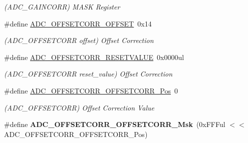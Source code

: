 \begin{DoxyCompactItemize}
\begin{DoxyCompactList}\small\item\em (A\+D\+C\+\_\+\+G\+A\+I\+N\+C\+O\+R\+R) M\+A\+S\+K Register \end{DoxyCompactList}\item 
\hypertarget{group___s_a_m_l21___a_d_c_gae30e343440c647c0051e1b85bbb1b4d7}{}\#define \hyperlink{group___s_a_m_l21___a_d_c_gae30e343440c647c0051e1b85bbb1b4d7}{A\+D\+C\+\_\+\+O\+F\+F\+S\+E\+T\+C\+O\+R\+R\+\_\+\+O\+F\+F\+S\+E\+T}~0x14\label{group___s_a_m_l21___a_d_c_gae30e343440c647c0051e1b85bbb1b4d7}

\begin{DoxyCompactList}\small\item\em (A\+D\+C\+\_\+\+O\+F\+F\+S\+E\+T\+C\+O\+R\+R offset) Offset Correction \end{DoxyCompactList}\item 
\hypertarget{group___s_a_m_l21___a_d_c_ga235cb38d1ff56b8a68b4fc572ff8927f}{}\#define \hyperlink{group___s_a_m_l21___a_d_c_ga235cb38d1ff56b8a68b4fc572ff8927f}{A\+D\+C\+\_\+\+O\+F\+F\+S\+E\+T\+C\+O\+R\+R\+\_\+\+R\+E\+S\+E\+T\+V\+A\+L\+U\+E}~0x0000ul\label{group___s_a_m_l21___a_d_c_ga235cb38d1ff56b8a68b4fc572ff8927f}

\begin{DoxyCompactList}\small\item\em (A\+D\+C\+\_\+\+O\+F\+F\+S\+E\+T\+C\+O\+R\+R reset\+\_\+value) Offset Correction \end{DoxyCompactList}\item 
\hypertarget{group___s_a_m_l21___a_d_c_ga9b51f7b2fce4e38ea6e2f545e8200cb0}{}\#define \hyperlink{group___s_a_m_l21___a_d_c_ga9b51f7b2fce4e38ea6e2f545e8200cb0}{A\+D\+C\+\_\+\+O\+F\+F\+S\+E\+T\+C\+O\+R\+R\+\_\+\+O\+F\+F\+S\+E\+T\+C\+O\+R\+R\+\_\+\+Pos}~0\label{group___s_a_m_l21___a_d_c_ga9b51f7b2fce4e38ea6e2f545e8200cb0}

\begin{DoxyCompactList}\small\item\em (A\+D\+C\+\_\+\+O\+F\+F\+S\+E\+T\+C\+O\+R\+R) Offset Correction Value \end{DoxyCompactList}\item 
\hypertarget{group___s_a_m_l21___a_d_c_ga88454d35ca4f90e7b7e1f012ce8093cf}{}\#define {\bfseries A\+D\+C\+\_\+\+O\+F\+F\+S\+E\+T\+C\+O\+R\+R\+\_\+\+O\+F\+F\+S\+E\+T\+C\+O\+R\+R\+\_\+\+Msk}~(0x\+F\+F\+Ful $<$$<$ A\+D\+C\+\_\+\+O\+F\+F\+S\+E\+T\+C\+O\+R\+R\+\_\+\+O\+F\+F\+S\+E\+T\+C\+O\+R\+R\+\_\+\+Pos)\label{group___s_a_m_l21___a_d_c_ga88454d35ca4f90e7b7e1f012ce8093cf}


\end{DoxyCompactItemize}
